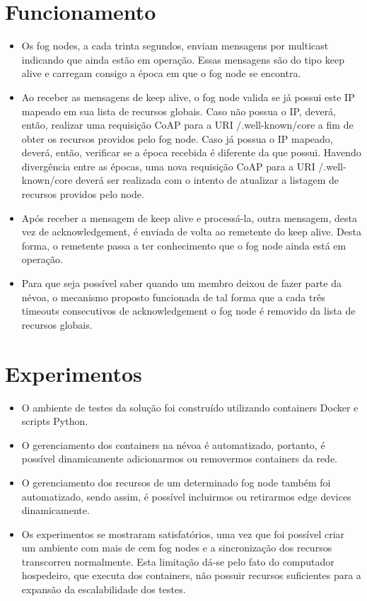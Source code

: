 \documentclass[a0,portrait]{lab-poster}
\begin{document}
\begin{multicols}{2}
\section*{\huge Funcionamento}

\Large
\justifying
\begin{itemize}

\item Os fog nodes, a cada trinta segundos, enviam mensagens por multicast indicando que ainda estão em operação.
Essas mensagens são do tipo keep alive e carregam consigo a época em que o fog node se encontra. 
\item Ao receber as mensagens de keep alive, o fog node valida se já possui este IP mapeado em sua lista de recursos globais.
Caso não possua o IP, deverá, então, realizar uma requisição CoAP para a URI /.well-known/core a fim de obter os recursos providos pelo fog node.
Caso já possua o IP mapeado, deverá, então, verificar se a época recebida é diferente da que possui.
Havendo divergência entre as épocas, uma nova requisição CoAP para a URI /.well-known/core deverá ser realizada com o intento de atualizar a listagem de recursos providos pelo node.
\item Após receber a mensagem de keep alive e processá-la, outra mensagem, desta vez de acknowledgement, é enviada de volta ao remetente do keep alive.
Desta forma, o remetente passa a ter conhecimento que o fog node ainda está em operação.
\item Para que seja possível saber quando um membro deixou de fazer parte da névoa, o mecanismo proposto funcionada de tal forma que a cada três timeouts consecutivos de acknowledgement
o fog node é removido da lista de recursos globais.

\end{itemize}

\section*{\huge Experimentos}

\Large
\justifying
\begin{itemize}

\item O ambiente de testes da solução foi construído utilizando containers Docker e scripts Python.
\item O gerenciamento dos containers na névoa é automatizado, portanto, é possível dinamicamente adicionarmos ou removermos containers da rede.
\item O gerenciamento dos recursos de um determinado fog node também foi automatizado, sendo assim, é possível incluirmos ou retirarmos edge devices dinamicamente.
\item Os experimentos se mostraram satisfatórios, uma vez que foi possível criar um ambiente com mais de cem fog nodes e a sincronização dos recursos transcorreu normalmente.
Esta limitação dá-se pelo fato do computador hospedeiro, que executa dos containers, não possuir recursos suficientes para a expansão da escalabilidade dos testes.



\end{itemize}
\end{multicols}
\end{document}
